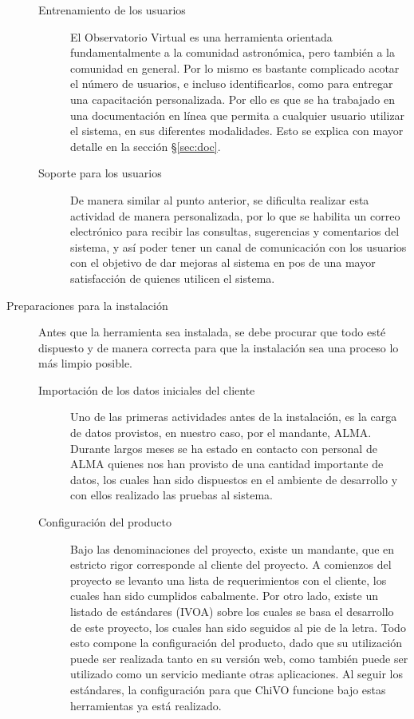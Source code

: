 \begin{description}
\begin{description}
			\item [Entrenamiento de los usuarios] El Observatorio Virtual es una herramienta orientada fundamentalmente a la comunidad astronómica, pero tambi\'en a la comunidad en general. Por lo mismo es bastante complicado acotar el número de usuarios, e incluso identificarlos, como para entregar una capacitación personalizada. Por ello es que se ha trabajado en una documentación en línea que permita a cualquier usuario utilizar el sistema, en sus diferentes modalidades. Esto se explica con mayor detalle en la sección \S\ref{sec:doc}.
			\item [Soporte para los usuarios] De manera similar al punto anterior, se dificulta realizar esta actividad de manera personalizada, por lo que se habilita un correo electrónico\footnotemark{} para recibir las consultas, sugerencias y comentarios del sistema, y así poder tener un canal de comunicación con los usuarios con el objetivo de dar mejoras al sistema en pos de una mayor satisfacción de quienes utilicen el sistema.
		\end{description}
	\item [Preparaciones para la instalación] Antes que la herramienta sea instalada, se debe procurar que todo est\'e dispuesto y de manera correcta para que la instalación sea una proceso lo más limpio posible.
		\begin{description}
			\item [Importación de los datos iniciales del cliente] Uno de las primeras actividades antes de la instalación, es la carga de datos provistos, en nuestro caso, por el mandante, ALMA. Durante largos meses se ha estado en contacto con personal de ALMA quienes nos han provisto de una cantidad importante de datos, los cuales han sido dispuestos en el ambiente de desarrollo y con ellos realizado las pruebas al sistema.
			\item [Configuración del producto] Bajo las denominaciones del proyecto, existe un mandante, que en estricto rigor corresponde al cliente del proyecto. A comienzos del proyecto se levanto una lista de requerimientos con el cliente, los cuales han sido cumplidos cabalmente. Por otro lado, existe un listado de estándares (IVOA) sobre los cuales se basa el desarrollo de este proyecto, los cuales han sido seguidos al pie de la letra. Todo esto compone la configuración del producto, dado que su utilización puede ser realizada tanto en su versión web, como tambi\'en puede ser utilizado como un servicio mediante otras aplicaciones. Al seguir los estándares, la configuración para que ChiVO funcione bajo estas herramientas ya está realizado.

\end{description}
\end{description}
